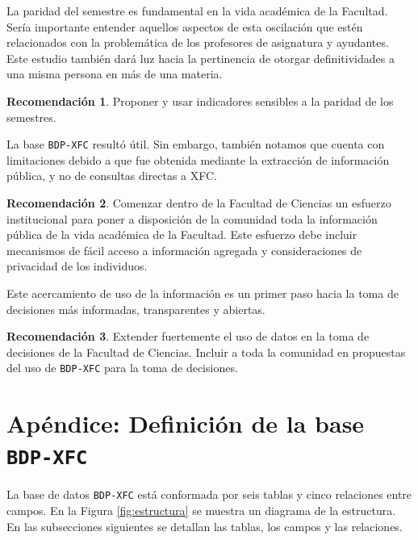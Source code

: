 \documentclass[twocolumn]{article}
\theoremstyle{definition}
\newtheorem{recomendacion}{Recomendación}
\begin{document}
La paridad del semestre es fundamental en la vida académica de la Facultad. Sería importante entender aquellos aspectos de esta oscilación que estén relacionados con la problemática de los profesores de asignatura y ayudantes. Este estudio también dará luz hacia la pertinencia de otorgar definitividades a una misma persona en más de una materia.

\begin{recomendacion}

Proponer y usar indicadores sensibles a la paridad de los semestres.

\end{recomendacion}

La base \texttt{BDP-XFC} resultó útil. Sin embargo, también notamos que cuenta con limitaciones debido a que fue obtenida mediante la extracción de información pública, y no de consultas directas a XFC.

\begin{recomendacion}
Comenzar dentro de la Facultad de Ciencias un esfuerzo institucional para poner a disposición de la comunidad toda la información pública de la vida académica de la Facultad. Este esfuerzo debe incluir mecanismos de fácil acceso a información agregada y consideraciones de privacidad de los individuos. 
\end{recomendacion}

Este acercamiento de uso de la información es un primer paso hacia la toma de decisiones más informadas, transparentes y abiertas.

\begin{recomendacion}

Extender fuertemente el uso de datos en la toma de decisiones de la Facultad de Ciencias. Incluir a toda la comunidad en propuestas del uso de \texttt{BDP-XFC} para la toma de decisiones.

\end{recomendacion}




\section*{Apéndice: Definición de la base \texttt{BDP-XFC}}

La base de datos \texttt{BDP-XFC} está conformada por seis tablas y cinco relaciones entre campos. En la Figura \ref{fig:estructura} se muestra un diagrama de la estructura. En las subsecciones siguientes se detallan las tablas, los campos y las relaciones.
\end{document}
